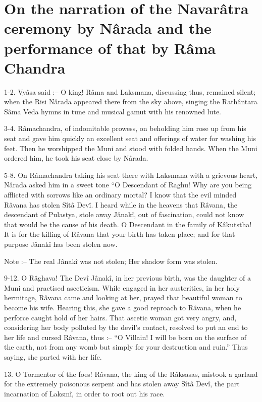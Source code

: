 ﻿\chapter[On the narration of the Navar\^atra ceremony]{On the narration of the Navar\^atra ceremony by N\^arada and the performance of that by R\^ama Chandra}

1-2. Vy\^asa said :-- O king! R\^ama and Laksmana, discussing thus, remained silent; when the Risi N\^arada appeared there from the sky above, singing the Rath\^antara S\^ama Veda hymns in tune and musical gamut with his renowned lute.

3-4. R\^amachandra, of indomitable prowess, on beholding him rose up from his seat and gave him quickly an excellent seat and offerings of water for washing his feet. Then he worshipped the Muni and stood with folded hands. When the Muni ordered him, he took his seat close by N\^arada.

5-8. On R\^amachandra taking his seat there with Laksmana with a grievous heart, N\^arada asked him in a sweet tone ``O Descendant of Raghu! Why are you being afflicted with sorrows like an ordinary mortal? I know that the evil minded R\^avana has stolen S\^it\^a Dev\^i. I heard while in the heavens that R\^avana, the descendant of Pulastya, stole away J\^anak\^i, out of fascination, could not know that would be the cause of his death. O Descendant in the family of K\^akutstha! It is for the killing of R\^avana that your birth has taken place; and for that purpose J\^anak\^i has been stolen now.

Note :-- The real J\^anak\^i was not stolen; Her shadow form was stolen.

9-12. O R\^aghava! The Dev\^i J\^anak\^i, in her previous birth, was the daughter of a Muni and practised asceticism. While engaged in her austerities, in her holy hermitage, R\^avana came and looking at her, prayed that beautiful woman to become his wife. Hearing this, she gave a good reproach to R\^avana, when he perforce caught hold of her hairs. That ascetic woman got very angry, and, considering her body polluted by the devil's contact, resolved to put an end to her life and cursed R\^avana, thus :-- ``O Villain! I will be born on the surface of the earth, not from any womb but simply for your destruction and ruin.'' Thus saying, she parted with her life.

13. O Tormentor of the foes! R\^avana, the king of the R\^aksasas, mistook a garland for the extremely poisonous serpent and has stolen away S\^it\^a Dev\^i, the part incarnation of Laksm\^i, in order to root out his race.

